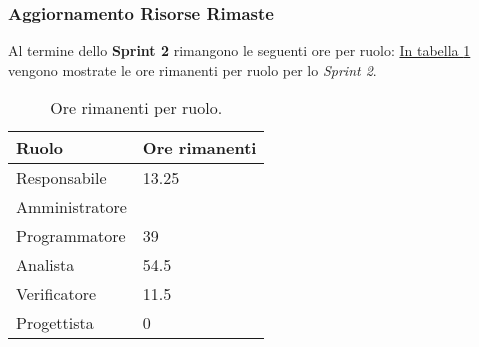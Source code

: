 \subsubsection{Aggiornamento Risorse Rimaste}
Al termine dello \textbf{Sprint 2} rimangono le seguenti ore per ruolo: \hyperref[tab:sprint2_ore_rimanenti]{In tabella \ref{tab:sprint2_ore_rimanenti}} vengono mostrate le ore rimanenti per ruolo per lo \textit{Sprint 2}.

\begin{table}[H]
    \centering
    \begin{tabular}{| l | l |}
    \hline
    \textbf{Ruolo} & 
    \textbf{Ore rimanenti}\\
    \hline
        Responsabile & 13.25\\
    \hline
        Amministratore & \\
    \hline
        Programmatore & 39\\
    \hline
        Analista & 54.5\\
    \hline
        Verificatore & 11.5\\
    \hline
        Progettista & 0\\
    \hline
    \end{tabular}
    \caption{Ore rimanenti per ruolo.}
    \label{tab:sprint2_ore_rimanenti} 
\end{table}